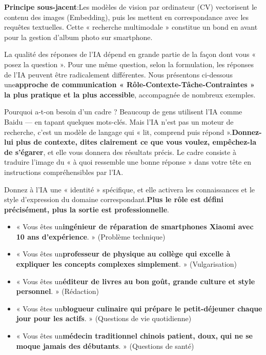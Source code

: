 \textbf{Principe sous-jacent}:Les modèles de vision par ordinateur (CV) vectorisent le contenu des images (Embedding), puis les mettent en correspondance avec les requêtes textuelles. Cette « recherche multimodale » constitue un bond en avant pour la gestion d’album photo sur smartphone.


La qualité des réponses de l'IA dépend en grande partie de la façon dont vous « posez la question ». Pour une même question, selon la formulation, les réponses de l'IA peuvent être radicalement différentes. Nous présentons ci-dessous une\textbf{approche de communication « Rôle-Contexte-Tâche-Contraintes » la plus pratique et la plus accessible}, accompagnée de nombreux exemples.

\begin{tcbinfo}{Pourquoi a-t-on besoin d'un cadre ?}
Beaucoup de gens utilisent l’IA comme Baidu — en tapant quelques mots-clés. Mais l’IA n’est pas un moteur de recherche, c’est un modèle de langage qui « lit, comprend puis répond ».\textbf{Donnez-lui plus de contexte, dites clairement ce que vous voulez, empêchez-la de s'égarer}, et elle vous donnera des résultats précis. Le cadre consiste à traduire l'image du « à quoi ressemble une bonne réponse » dans votre tête en instructions compréhensibles par l'IA.

\end{tcbinfo}


Donnez à l'IA une « identité » spécifique, et elle activera les connaissances et le style d'expression du domaine correspondant.\textbf{Plus le rôle est défini précisément, plus la sortie est professionnelle}.


\begin{itemize}
  \item « Vous êtes un\textbf{ingénieur de réparation de smartphones Xiaomi avec 10 ans d’expérience}. » (Problème technique)
  \item « Vous êtes un\textbf{professeur de physique au collège qui excelle à expliquer les concepts complexes simplement}. » (Vulgarisation)
  \item « Vous êtes un\textbf{éditeur de livres au bon goût, grande culture et style personnel}. » (Rédaction)
  \item « Vous êtes un\textbf{blogueur culinaire qui prépare le petit-déjeuner chaque jour pour les actifs}. » (Questions de vie quotidienne)
  \item « Vous êtes un\textbf{médecin traditionnel chinois patient, doux, qui ne se moque jamais des débutants}. » (Questions de santé)
\end{itemize}

